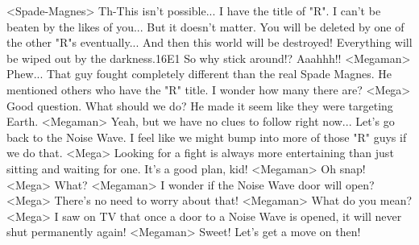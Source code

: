 <Spade-Magnes> Th-This isn't possible... 
I have the title of "R". I can't be beaten by the likes of you... 
But it doesn't matter. You will be deleted by one of the other "R"s eventually... 
And then this world will be destroyed! 
Everything will be wiped out by the darkness.{16}{E1} So why stick around!? 
Aaahhh!! 
<Megaman> Phew... 
That guy fought completely different than the real Spade Magnes. 
He mentioned others who have the "R" title. I wonder how many there are? 
<Mega> Good question. 
What should we do? He made it seem like they were targeting Earth. 
<Megaman> Yeah, but we have no clues to follow right now... Let's go back to the Noise Wave. 
I feel like we might bump into more of those "R" guys if we do that. 
<Mega> Looking for a fight is always more entertaining than just sitting and waiting for one. 
It's a good plan, kid! 
<Megaman> Oh snap! 
<Mega> What? 
<Megaman> I wonder if the Noise Wave door will open? 
<Mega> There's no need to worry about that! 
<Megaman> What do you mean? 
<Mega> I saw on TV that once a door to a Noise Wave is 
opened, it will never shut permanently again! 
<Megaman> Sweet! 
Let's get a move on then! 
